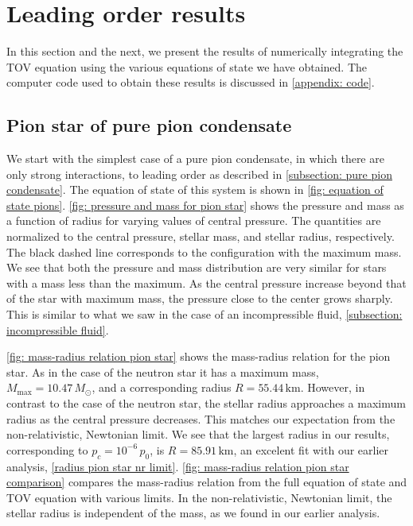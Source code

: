 \section{Leading order results}

In this section and the next, we present the results of numerically integrating the TOV equation using the various equations of state we have obtained.
The computer code used to obtain these results is discussed in \autoref{appendix: code}.



\subsection{Pion star of pure pion condensate}

We start with the simplest case of a pure pion condensate, in which there are only strong interactions, to leading order as described in \autoref{subsection: pure pion condensate}.
The equation of state of this system is shown in \autoref{fig: equation of state pions}.
\autoref{fig: pressure and mass for pion star} shows the pressure and mass as a function of radius for varying values of central pressure.
The quantities are normalized to the central pressure, stellar mass, and stellar radius, respectively.
The black dashed line corresponds to the configuration with the maximum mass.
We see that both the pressure and mass distribution are very similar for stars with a mass less than the maximum.
As the central pressure increase beyond that of the star with maximum mass, the pressure close to the center grows sharply.
This is similar to what we saw in the case of an incompressible fluid, \autoref{subsection: incompressible fluid}.

\autoref{fig: mass-radius relation pion star} shows the mass-radius relation for the pion star.
As in the case of the neutron star it has a maximum mass, $M_\text{max} = 10.47\, M_\odot$, and a corresponding radius $R = 55.44\,\text{km}$.
However, in contrast to the case of the neutron star, the stellar radius approaches a maximum radius as the central pressure decreases.
This matches our expectation from the non-relativistic, Newtonian limit.
We see that the largest radius in our results, corresponding to  $p_c = 10^{-6} \, p_0$, is $R = 85.91 \, \text{km}$, an excelent fit with our earlier analysis, \autoref{radius pion star nr limit}.
\autoref{fig: mass-radius relation pion star comparison} compares the mass-radius relation from the full equation of state and TOV equation with various limits.
In the non-relativistic, Newtonian limit, the stellar radius is independent of the mass, as we found in our earlier analysis.



